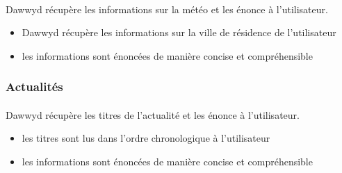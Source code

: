 \documentclass[12pt]{article}
\begin{document}
    \paragraph{}
    Dawwyd récupère les informations sur la météo et les énonce à
    l'utilisateur.

    \begin{itemize}
        \item Dawwyd récupère les informations sur la ville de résidence de
            l'utilisateur
        \item les informations sont énoncées de manière concise et
            compréhensible
    \end{itemize}

    \subsubsection{Actualités}
    \paragraph{}
    Dawwyd récupère les titres de l'actualité et les énonce à l'utilisateur.

    \begin{itemize}
        \item les titres sont lus dans l'ordre chronologique à l'utilisateur
        \item les informations sont énoncées de manière concise et
            compréhensible
    \end{itemize}
\end{document}
